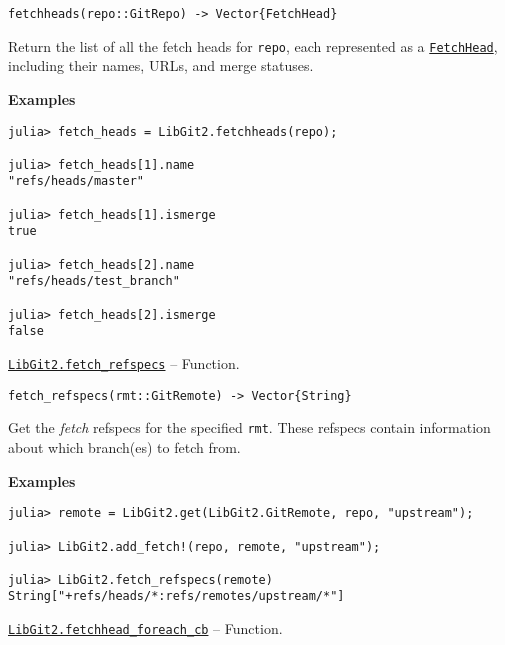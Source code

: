 \begin{adjustwidth}{2em}{0pt}


\begin{verbatim}
fetchheads(repo::GitRepo) -> Vector{FetchHead}
\end{verbatim}

Return the list of all the fetch heads for \texttt{repo}, each represented as a \hyperlink{17806809481919147110}{\texttt{FetchHead}}, including their names, URLs, and merge statuses.

\textbf{Examples}


\begin{verbatim}
julia> fetch_heads = LibGit2.fetchheads(repo);

julia> fetch_heads[1].name
"refs/heads/master"

julia> fetch_heads[1].ismerge
true

julia> fetch_heads[2].name
"refs/heads/test_branch"

julia> fetch_heads[2].ismerge
false
\end{verbatim}



\end{adjustwidth}
\hypertarget{2305079754843803490}{}
\hyperlink{2305079754843803490}{\texttt{LibGit2.fetch\_refspecs}}  -- {Function.}

\begin{adjustwidth}{2em}{0pt}


\begin{verbatim}
fetch_refspecs(rmt::GitRemote) -> Vector{String}
\end{verbatim}

Get the \emph{fetch} refspecs for the specified \texttt{rmt}. These refspecs contain information about which branch(es) to fetch from.

\textbf{Examples}


\begin{verbatim}
julia> remote = LibGit2.get(LibGit2.GitRemote, repo, "upstream");

julia> LibGit2.add_fetch!(repo, remote, "upstream");

julia> LibGit2.fetch_refspecs(remote)
String["+refs/heads/*:refs/remotes/upstream/*"]
\end{verbatim}



\end{adjustwidth}
\hypertarget{14433606895966923953}{}
\hyperlink{14433606895966923953}{\texttt{LibGit2.fetchhead\_foreach\_cb}}  -- {Function.}


